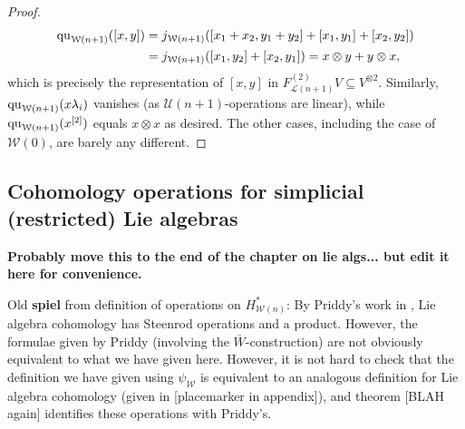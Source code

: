 \documentclass[11pt]{amsart}
\theoremstyle{plain}
\theoremstyle{definition}
\newcommand{\calW}{\mathcal{W}}
\newcommand{\calU}{\mathcal{U}}
\newcommand{\calL}{\mathcal{L}}
\theoremstyle{plain}
\newcommand{\restn}[1]{#1^{[2]}}
\newcommand{\quadratic}{\textup{qu}}
\begin{document}
\begin{Lie algebras in characteristic 2 and their homotopy operations}
\begin{proof}
\begin{alignat*}{2}
\quadratic_{\calW(n+1)}([x,y])&=j_{\calW(n+1)}([{x_1}+{{x_2}},{y_1}+{{y_2}}]+[{x_1},{y_1}]+[{{x_2}},{{y_2}}])\\
&=j_{\calW(n+1)}([{x_1},{{y_2}}]+[{{x_2}},{y_1}])=x\otimes y+y\otimes x,
\end{alignat*}
which is precisely the representation of $[x,y]$ in $F^{(2)}_{\calL(n+1)}V\subseteq V^{\otimes2}$. Similarly, $\quadratic_{\calW(n+1)}(x\lambda_i)$ vanishes (as $\calU(n+1)$-operations are linear), while $\quadratic_{\calW(n+1)}(\restn{x})$ equals $x\otimes x$ as desired. The other cases, including the case of $\calW(0)$, are barely any different.
\end{proof}

\subsection{Cohomology operations for simplicial (restricted) Lie algebras}\label{section: Cohomology operations for simplicial (restricted) Lie algebras}

\textbf{Probably move this to the end of the chapter on lie algs... but edit it here for convenience.}

Old \textbf{spiel} from definition of operations on $H^*_{\calW(n)}$:
By Priddy's work in \cite{PriddySimplicialLie.pdf}, Lie algebra cohomology has Steenrod operations and a product. However, the formulae given by Priddy (involving the $\overline{W}$-construction) are not obviously equivalent to what we have given here. However, it is not hard to check that the definition we have given using $\psi_\calW$ is equivalent to an analogous definition for Lie algebra cohomology (given in [placemarker in appendix]), and theorem [BLAH again] identifies these operations with Priddy's.


\end{Lie algebras in characteristic 2 and their homotopy operations}
\end{document}

